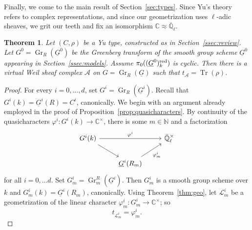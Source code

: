 \documentclass[10pt]{amsart}
\theoremstyle{plain}
\newtheorem{theorem}{Theorem}[section]
\theoremstyle{definition}
\newcommand{\NN}{{\mathbb{N}}}
\newcommand{\CC}{{\mathbb{C}}}
\newcommand{\EE}{\mathbb{\bar Q}_\ell}
\newcommand{\Fq}{k}
\newcommand{\EEx}{\EE^\times}
\DeclareMathOperator{\Gr}{Gr}
\DeclareMathOperator{\trace}{Tr}
\newcommand{\trFrob}[1]{t_{#1}}
\newcommand{\cs}[1]{{\mathcal{#1}}}
\begin{document}
Finally, we come to the main result of Section~\ref{sec:types}.
%
Since Yu's theory refers to complex representations, and since our geometrization uses $\ell$-adic sheaves, we grit our teeth and fix an isomorphism $\CC \approx \EE$.

\begin{theorem}\label{thm:geotypes}
Let $(C,\rho)$ be a Yu type, constructed as in Section~\ref{ssec:review}.
Let $G^0 = \Gr_{R}(\underline{G}^0)$ be the Greenberg transform of the smooth group scheme $\underline{G}^0$ appearing in Section~\ref{ssec:models}.
Assume $\pi_0((\underline{G}^0)_\Fq^\reductive)$ is cyclic.
Then there is a virtual Weil sheaf complex $\cs{A}$ on $G = \Gr_{R}(\underline{G})$ such that $\trFrob{\cs{A}} = \trace(\rho)$.
\end{theorem}

\begin{proof}
For every $i=0, \ldots ,d$, set $G^i = \Gr_{R}(\underline{G}^i)$.
Recall that $G^i(\Fq) = \underline{G}^i(R) = C^i$, canonically.
We begin with an argument already employed in the proof of Proposition~\ref{prop:quasicharacters}.
By continuity of the quasicharacters $\varphi^i : G^i(\Fq) \to \CC^\times$, there is some $m \in \NN$ and a factorization
\[
\begin{tikzcd}
G^i(\Fq) \arrow{rr}{\varphi^i} \arrow{rd} && \EEx\\
& \underline{G}^i(R_m) \arrow{ru}[swap]{\varphi^i_m} 
\end{tikzcd}
\] 
for all $i=0, \ldots d$.
Set $G_m^i = \Gr_m^{R}(\underline{G}^i)$.
Then $G_m^i$ is a smooth group scheme over $\Fq$ and $G_m^i(\Fq) = \underline{G}^i(R_m)$, canonically.
Using Theorem~\ref{thm:geo}, let $\cs{L}^i_m$ be a geometrization of the linear character $\varphi^i_m: G_m^i \to \CC^\times$; so
\[
\trFrob{\cs{L}^i_m} = \varphi^i_m.
\]


\end{proof}
\end{document}
